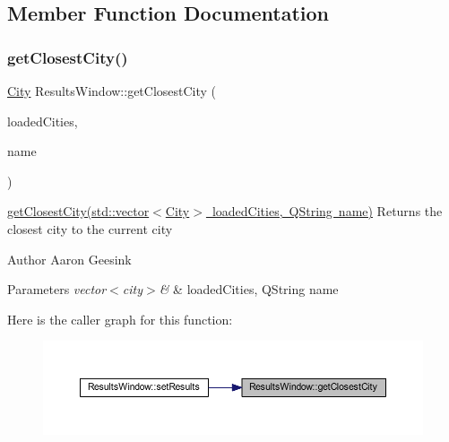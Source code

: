\subsection{Member Function Documentation}
\mbox{\label{class_results_window_ad58645a2626daa51d8e824d56df7145f}} 
\subsubsection{\texorpdfstring{getClosestCity()}{getClosestCity()}}
{\footnotesize\ttfamily \mbox{\hyperlink{class_city}{City}} Results\+Window\+::get\+Closest\+City (\begin{DoxyParamCaption}\item[{std\+::vector$<$ \mbox{\hyperlink{class_city}{City}} $>$}]{loaded\+Cities,  }\item[{Q\+String}]{name }\end{DoxyParamCaption})}



\mbox{\hyperlink{class_results_window_ad58645a2626daa51d8e824d56df7145f}{get\+Closest\+City(std\+::vector$<$\+City$>$ loaded\+Cities, Q\+String name)}} Returns the closest city to the current city 

\begin{DoxyAuthor}{Author}
Aaron Geesink 
\end{DoxyAuthor}

\begin{DoxyParams}{Parameters}
{\em vector$<$city$>$\&} & loaded\+Cities, Q\+String name \\
\hline
\end{DoxyParams}
Here is the caller graph for this function\+:
\nopagebreak
\begin{figure}[H]
\begin{center}
\leavevmode
\includegraphics[width=350pt]{class_results_window_ad58645a2626daa51d8e824d56df7145f_icgraph}
\end{center}
\end{figure}
\mbox{\label{class_results_window_ae9d02be8b007fcbc61f6d6536ba1520f}} 
